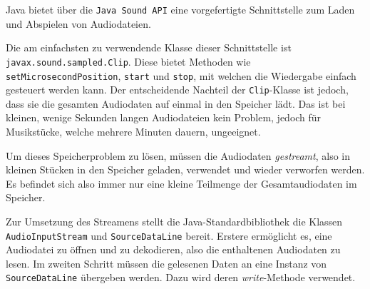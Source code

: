 Java bietet über die \texttt{Java Sound API} eine vorgefertigte Schnittstelle zum Laden und Abspielen von Audiodateien.
\par Die am einfachsten zu verwendende Klasse dieser Schnittstelle ist
\texttt{javax.sound.sampled.Clip}. Diese bietet Methoden wie \texttt{setMicrosecondPosition}, \texttt{start} und \texttt{stop}, mit
welchen die Wiedergabe einfach gesteuert werden kann. Der entscheidende
Nachteil der \texttt{Clip}-Klasse ist jedoch, dass sie die gesamten Audiodaten auf einmal in den Speicher lädt. Das ist bei kleinen, wenige Sekunden langen Audiodateien kein Problem, jedoch für Musikstücke, welche mehrere Minuten dauern, ungeeignet. 
\par Um dieses Speicherproblem zu lösen, müssen die Audiodaten \textit{gestreamt},
also in kleinen Stücken in den Speicher geladen, verwendet und wieder
verworfen werden. Es befindet sich also immer nur eine kleine Teilmenge der Gesamtaudiodaten im Speicher.
\par Zur Umsetzung des Streamens stellt die Java-Standardbibliothek die Klassen \texttt{AudioInputStream} und \texttt{SourceDataLine} bereit. Erstere ermöglicht es, eine Audiodatei zu öffnen und zu
dekodieren, also die enthaltenen Audiodaten zu lesen. Im zweiten
Schritt müssen die gelesenen Daten an eine Instanz von \texttt{SourceDataLine} übergeben werden. Dazu wird deren \textit{write}-Methode verwendet.